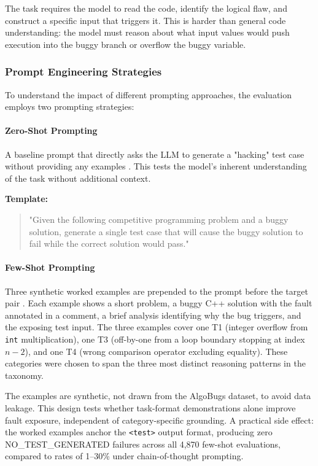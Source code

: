 The task requires the model to read the code, identify the logical flaw, and construct a specific input that triggers it. This is harder than general code understanding: the model must reason about what input values would push execution into the buggy branch or overflow the buggy variable.

\subsubsection{Prompt Engineering Strategies}

To understand the impact of different prompting approaches, the evaluation employs two prompting strategies:

\paragraph{Zero-Shot Prompting}

A baseline prompt that directly asks the LLM to generate a "hacking" test case without providing any examples \cite{dong2024survey}. This tests the model's inherent understanding of the task without additional context.

\textbf{Template:}
\begin{quote}
"Given the following competitive programming problem and a buggy solution, generate a single test case that will cause the buggy solution to fail while the correct solution would pass."
\end{quote}

\paragraph{Few-Shot Prompting}

Three synthetic worked examples are prepended to the prompt before the target pair \cite{promptpanda2025few, learnprompting2025shot}. Each example shows a short problem, a buggy C++ solution with the fault annotated in a comment, a brief analysis identifying why the bug triggers, and the exposing test input. The three examples cover one T1 (integer overflow from \texttt{int} multiplication), one T3 (off-by-one from a loop boundary stopping at index $n-2$), and one T4 (wrong comparison operator excluding equality). These categories were chosen to span the three most distinct reasoning patterns in the taxonomy.

The examples are synthetic, not drawn from the AlgoBugs dataset, to avoid data leakage. This design tests whether task-format demonstrations alone improve fault exposure, independent of category-specific grounding. A practical side effect: the worked examples anchor the \texttt{<test>} output format, producing zero \textsc{NO\_TEST\_GENERATED} failures across all 4,870 few-shot evaluations, compared to rates of 1--30\% under chain-of-thought prompting.

